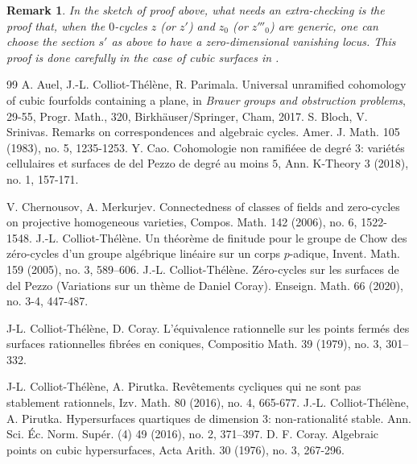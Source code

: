 \documentclass[10pt]{article}
\newtheorem{rema}[theo]{Remark}
\begin{document}
\begin{rema}\label{reamresteaprouver} {\rm  In the sketch of proof above, what needs an extra-checking is the proof that, when the $0$-cycles $z$ (or $z'$) and $z_0$ (or $z'''_0$) are generic,  one can choose the section $s'$ as above to have a zero-dimensional vanishing locus. This proof is done carefully in the case of cubic surfaces in \cite{voisindelpezzo}.}
\end{rema}

\begin{thebibliography}{99}
 A.  Auel, J.-L. Colliot-Th\'{e}l\`{e}ne, R. Parimala. Universal unramified cohomology of cubic fourfolds containing a plane, in {\it Brauer groups and obstruction problems}, 29-55, Progr. Math., 320, Birkh\"{a}user/Springer, Cham, 2017.
 S. Bloch, V. Srinivas. Remarks on correspondences and algebraic cycles. Amer. J. Math. 105 (1983), no. 5, 1235-1253.
     Y. Cao.  Cohomologie non ramifi\'{e}ee de degr\'{e} $3$: vari\'{e}t\'{e}s cellulaires et surfaces de del Pezzo de degr\'{e}
au moins $5$,  Ann. K-Theory 3 (2018), no. 1, 157-171.

 V. Chernousov, A. Merkurjev. Connectedness of classes of fields and zero-cycles on projective
homogeneous varieties,  Compos. Math. 142 (2006), no. 6,
1522-1548.
 J.-L. Colliot-Th\'{e}l\`{e}ne. Un th\'{e}or\`{e}me de finitude pour le groupe de Chow des z\'{e}ro-cycles d'un groupe alg\'{e}brique lin\'{e}aire
sur un corps
$p$-adique,
Invent. Math. 159 (2005), no. 3, 589–606.
  J.-L. Colliot-Th\'{e}l\`{e}ne.  Z\'{e}ro-cycles sur les surfaces de del Pezzo (Variations sur un th\`{e}me de Daniel Coray).  Enseign. Math. 66 (2020), no. 3-4, 447-487.

 J-L. Colliot-Th\'{e}l\`{e}ne, D. Coray.  L'\'{e}quivalence rationnelle sur les points ferm\'{e}s des surfaces rationnelles fibr\'{e}es en coniques,  Compositio Math. 39 (1979), no. 3, 301–332.


 J-L. Colliot-Th\'{e}l\`{e}ne, A. Pirutka.
Rev\^{e}tements cycliques qui ne sont pas stablement rationnels,
Izv. Math. 80 (2016), no. 4, 665-677.
     J.-L. Colliot-Th\'{e}l\`{e}ne, A. Pirutka.  Hypersurfaces quartiques de dimension 3: non-rationalit\'{e} stable.
Ann. Sci. \'{E}c. Norm. Sup\'{e}r. (4) 49 (2016), no. 2, 371–397.
 D. F. Coray. Algebraic points on cubic hypersurfaces, Acta Arith. 30 (1976), no. 3,
267-296.



\end{thebibliography}
\end{document}
